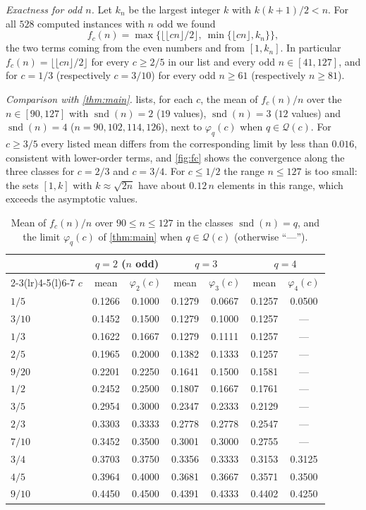 \documentclass[11pt,reqno]{amsart}
\numberwithin{equation}{section}
\theoremstyle{definition}
\theoremstyle{remark}
\newcommand{\floor}[1]{\lfloor #1\rfloor}
\newcommand{\snd}{\operatorname{snd}}
\begin{document}
\emph{Exactness for odd $n$.} Let $k_n$ be the largest integer $k$ with $k(k+1)/2<n$. For all $528$ computed instances with $n$ odd we found
\[
 f_c(n)=\max\bigl\{\floor{\floor{cn}/2},\ \min\{\floor{cn},k_n\}\bigr\},
\]
the two terms coming from the even numbers and from $[1,k_n]$. In particular $f_c(n)=\floor{\floor{cn}/2}$ for every $c\ge2/5$ in our list and every odd $n\in[41,127]$, and for $c=1/3$ (respectively $c=3/10$) for every odd $n\ge61$ (respectively $n\ge81$).

\emph{Comparison with \cref{thm:main}.}  lists, for each $c$, the mean of $f_c(n)/n$ over the $n\in[90,127]$ with $\snd(n)=2$ ($19$ values), $\snd(n)=3$ ($12$ values) and $\snd(n)=4$ ($n=90,102,114,126$), next to $\varphi_q(c)$ when $q\in\mathcal Q(c)$. For $c\ge3/5$ every listed mean differs from the corresponding limit by less than $0.016$, consistent with lower-order terms, and \cref{fig:fc} shows the convergence along the three classes for $c=2/3$ and $c=3/4$. For $c\le1/2$ the range $n\le127$ is too small: the sets $[1,k]$ with $k\approx\sqrt{2n}$ have about $0.12\,n$ elements in this range, which exceeds the asymptotic values.

\begin{table}[ht]
\centering
\caption{Mean of $f_c(n)/n$ over $90\le n\le127$ in the classes $\snd(n)=q$, and the limit $\varphi_q(c)$ of \cref{thm:main} when $q\in\mathcal Q(c)$ (otherwise ``---'').}\label{tab:numerics}
\begin{tabular}{@{}lcccccc@{}}
\toprule
& \multicolumn{2}{c}{$q=2$ ($n$ odd)} & \multicolumn{2}{c}{$q=3$} & \multicolumn{2}{c}{$q=4$}\\
\cmidrule(lr){2-3}\cmidrule(lr){4-5}\cmidrule(l){6-7}
$c$ & mean & $\varphi_2(c)$ & mean & $\varphi_3(c)$ & mean & $\varphi_4(c)$\\
\midrule
$1/5$ & 0.1266 & 0.1000 & 0.1279 & 0.0667 & 0.1257 & 0.0500 \\
$3/10$ & 0.1452 & 0.1500 & 0.1279 & 0.1000 & 0.1257 & --- \\
$1/3$ & 0.1622 & 0.1667 & 0.1279 & 0.1111 & 0.1257 & --- \\
$2/5$ & 0.1965 & 0.2000 & 0.1382 & 0.1333 & 0.1257 & --- \\
$9/20$ & 0.2201 & 0.2250 & 0.1641 & 0.1500 & 0.1581 & --- \\
$1/2$ & 0.2452 & 0.2500 & 0.1807 & 0.1667 & 0.1761 & --- \\
$3/5$ & 0.2954 & 0.3000 & 0.2347 & 0.2333 & 0.2129 & --- \\
$2/3$ & 0.3303 & 0.3333 & 0.2778 & 0.2778 & 0.2547 & --- \\
$7/10$ & 0.3452 & 0.3500 & 0.3001 & 0.3000 & 0.2755 & --- \\
$3/4$ & 0.3703 & 0.3750 & 0.3356 & 0.3333 & 0.3153 & 0.3125 \\
$4/5$ & 0.3964 & 0.4000 & 0.3681 & 0.3667 & 0.3571 & 0.3500 \\
$9/10$ & 0.4450 & 0.4500 & 0.4391 & 0.4333 & 0.4402 & 0.4250 \\
\bottomrule
\end{tabular}
\end{table}
\end{document}
